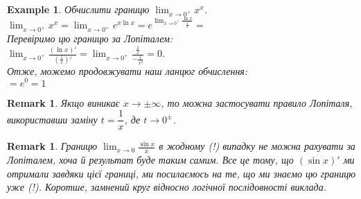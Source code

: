 \documentclass[a4paper, 14pt]{article}
\def\huge{\displaystyle}
\theoremstyle{theoremdd}
\theoremstyle{theoremdd}
\theoremstyle{theoremdd}
\theoremstyle{theoremdd}
\newtheorem{example}[theorem]{Example}
\theoremstyle{theoremdd}
\theoremstyle{theoremdd}
\newtheorem{remark}[theorem]{Remark}
\theoremstyle{theoremdd}
\theoremstyle{theoremdd}
\begin{document}
\begin{example}
Обчислити границю $\huge \lim_{x \to 0^+} x^x$.\\
$\huge \lim_{x \to 0^+} x^x = \lim_{x \to 0^+} e^{x \ln x} = e^{\displaystyle \lim_{x \to 0^+} \frac{\ln x}{\frac{1}{x}}} \boxed{=}$\\
Перевіримо цю границю за Лопіталем:\\
$\huge \lim_{x \to 0^+} \frac{(\ln x)'}{\left(\frac{1}{x}\right)'} = \lim_{x \to 0^+} \frac{\frac{1}{x}}{-\frac{1}{x^2}} = 0$.\\
Отже, можемо продовжувати наш ланцюг обчислення:\\
$\boxed{=} e^0 = 1$
\end{example}

\begin{remark}
Якщо виникає $x \to \pm \infty$, то можна застосувати правило Лопіталя, використавши заміну $t = \dfrac{1}{x}$, де $t \to 0^{\pm}$.
\end{remark}

\begin{remark}
Границю $\huge \lim_{x \to 0} \frac{\sin x}{x}$ в жодному (!) випадку не можна рахувати за Лопіталем, хоча й результат буде таким самим. Все це тому, що $(\sin x)'$ ми отримали завдяки цієї границі, ми посилаємось на те, що ми знаємо цю границю уже (!). Коротше, замнений круг відносно логічної послідовності виклада.
\end{remark}
\end{document}
